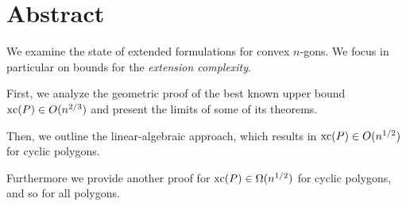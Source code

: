 \section*{Abstract}

We examine the state of extended formulations for convex $n$-gons. We focus in particular on bounds for the \emph{extension complexity}.

First, we analyze the geometric proof of the best known upper bound $\operatorname{xc}(P) \in O(n^{2/3})$ and present the limits of some of its theorems.

Then, we outline the linear-algebraic approach, which results in $\operatorname{xc}(P) \in O(n^{1/2})$ for cyclic polygons.

Furthermore we provide another proof for $\operatorname{xc}(P) \in \Omega(n^{1/2})$ for cyclic polygons, and so for all polygons.
